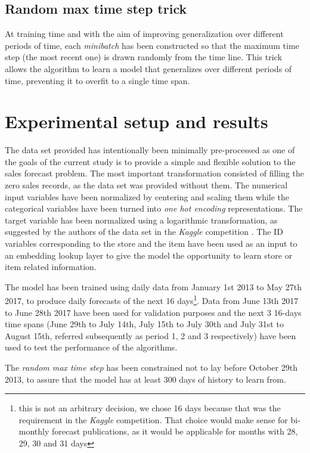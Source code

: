 \subsection{Random max time step trick}
At training time and with the aim of improving generalization over different periods of time, each \textit{minibatch} has been constructed so that the maximum time step (the most recent one)  is drawn randomly from the time line. This trick allows the algorithm to learn a model that generalizes over different periods of time, preventing it to overfit to a single time span.

\section{Experimental setup and results} \label{sec:salesforecast_results}
The data set provided has intentionally been minimally pre-processed as one of the goals of the current study is to provide a simple and flexible solution to the sales forecast problem. The most important transformation consisted of filling the zero sales records, as the data set was provided without them. The numerical input variables have been normalized by centering and scaling them while the categorical variables have been turned into \textit{one hot encoding} representations. The target variable has been normalized using a logarithmic transformation, as suggested by the authors of the data set in the \textit{Kaggle} competition \autocite{corporacionfavoritadataset2018}. The ID variables corresponding to the store and the item have been used as an input to an embedding lookup layer to give the model the opportunity to learn store or item related information.

The model has been trained using daily data from January 1st 2013 to May 27th 2017, to produce daily forecasts of the next 16 days\footnote{this is not an arbitrary decision, we chose 16 days because that was the requirement in the \textit{Kaggle} competition. That choice would make sense for bi-monthly forecast publications, as it would be applicable for months with 28, 29, 30 and 31 days}. Data from  June 13th 2017 to June 28th 2017 have been used for validation purposes and the next 3 16-days time spans (June 29th to July 14th, July 15th to July 30th and July 31st to August 15th, referred subsequently as period 1, 2 and 3 respectively) have been used to test the performance of the algorithms.

The \textit{random max time step} has been constrained not to lay before October 29th 2013, to assure that the model has at least 300 days of history to learn from.

